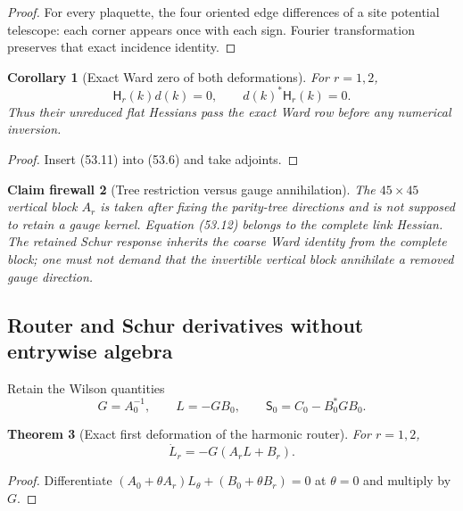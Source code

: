 \documentclass[11pt,oneside]{book}
\newtheorem{theorem}{Theorem}[chapter]
\newtheorem{corollary}[theorem]{Corollary}
\newtheorem{firewall}[theorem]{Claim firewall}
\theoremstyle{definition}
\theoremstyle{remark}
\begin{document}
\begin{proof}
For every plaquette, the four oriented edge differences of a site
potential telescope: each corner appears once with each sign.
Fourier transformation preserves that exact incidence identity.
\end{proof}

\begin{corollary}[Exact Ward zero of both deformations]
\label{cor:e8v53-Ward-zero}
For \(r=1,2\),
\[
 {\mathsf H}_r(k)d(k)=0,\qquad
 d(k)^*{\mathsf H}_r(k)=0.                                   \tag{53.12}
\]
Thus their unreduced flat Hessians pass the exact Ward row before
any numerical inversion.
\end{corollary}

\begin{proof}
Insert (53.11) into (53.6) and take adjoints.
\end{proof}

\begin{firewall}[Tree restriction versus gauge annihilation]
\label{fire:e8v53-tree-Ward}
The \(45\times45\) vertical block \(A_r\) is taken after fixing the
parity-tree directions and is not supposed to retain a gauge
kernel.  Equation (53.12) belongs to the complete link Hessian.
The retained Schur response inherits the coarse Ward identity from
the complete block; one must not demand that the invertible
vertical block annihilate a removed gauge direction.
\end{firewall}

\subsection{Router and Schur derivatives without entrywise algebra}

Retain the Wilson quantities
\[
 G=A_0^{-1},\qquad L=-GB_0,\qquad
 {\mathsf S}_0=C_0-B_0^*GB_0.                                \tag{53.13}
\]

\begin{theorem}[Exact first deformation of the harmonic router]
\label{thm:e8v53-router-derivative}
For \(r=1,2\),
\[
 \boxed{\dot L_r=-G(A_rL+B_r).}                              \tag{53.14}
\]
\end{theorem}

\begin{proof}
Differentiate
\((A_0+\theta A_r)L_\theta+(B_0+\theta B_r)=0\) at
\(\theta=0\) and multiply by \(G\).
\end{proof}
\end{document}
